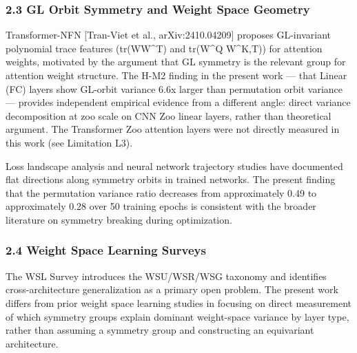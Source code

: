 \subsubsection{2.3 GL Orbit Symmetry and Weight Space Geometry}

Transformer-NFN [Tran-Viet et al., arXiv:2410.04209] proposes GL-invariant polynomial trace features (tr(WW^T) and tr(W^Q W^{K,T})) for attention weights, motivated by the argument that GL symmetry is the relevant group for attention weight structure. The H-M2 finding in the present work — that Linear (FC) layers show GL-orbit variance 6.6x larger than permutation orbit variance — provides independent empirical evidence from a different angle: direct variance decomposition at zoo scale on CNN Zoo linear layers, rather than theoretical argument. The Transformer Zoo attention layers were not directly measured in this work (see Limitation L3).

Loss landscape analysis and neural network trajectory studies have documented flat directions along symmetry orbits in trained networks. The present finding that the permutation variance ratio decreases from approximately 0.49 to approximately 0.28 over 50 training epochs is consistent with the broader literature on symmetry breaking during optimization.

\subsubsection{2.4 Weight Space Learning Surveys}

The WSL Survey \citep{Hanetal2026} introduces the WSU/WSR/WSG taxonomy and identifies cross-architecture generalization as a primary open problem. The present work differs from prior weight space learning studies in focusing on direct measurement of which symmetry groups explain dominant weight-space variance by layer type, rather than assuming a symmetry group and constructing an equivariant architecture.

